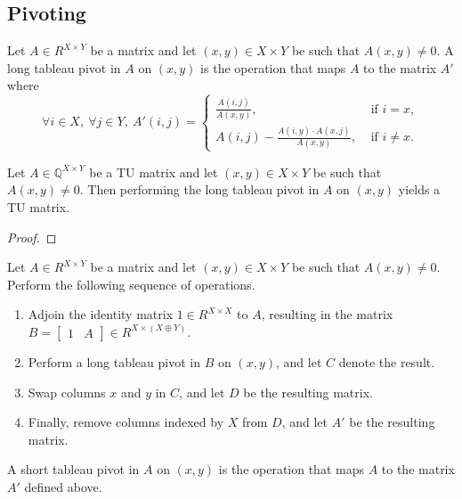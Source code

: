 \subsection{Pivoting}


\begin{definition}
    \label{Matrix.longTableauPivot}
    \leanok
    Let $A \in R^{X \times Y}$ be a matrix and let $(x, y) \in X \times Y$ be such that $A (x, y) \neq 0$. A long tableau pivot in $A$ on $(x, y)$ is the operation that maps $A$ to the matrix $A'$ where
    \[
        \forall i \in X, \ \forall j \in Y, \ A' (i, j) = \begin{cases}
            \frac{A (i, j)}{A (x, y)}, & \text{ if } i = x, \\
            A (i, j) - \frac{A (i, y) \cdot A (x, j)}{A (x, y)}, & \text{ if } i \neq x.
        \end{cases}
    \]
\end{definition}

\begin{lemma}
    \label{Matrix.IsTotallyUnimodular.longTableauPivot}
    \leanok
    Let $A \in \mathbb{Q}^{X \times Y}$ be a TU matrix and let $(x, y) \in X \times Y$ be such that $A (x, y) \neq 0$. Then performing the long tableau pivot in $A$ on $(x, y)$ yields a TU matrix.
\end{lemma}

\begin{proof}
    \leanok
    \SeeLean
\end{proof}



\begin{definition}
    \label{Matrix.shortTableauPivot}
    \leanok
    Let $A \in R^{X \times Y}$ be a matrix and let $(x, y) \in X \times Y$ be such that $A (x, y) \neq 0$. Perform the following sequence of operations.
    \begin{enumerate}
        \item Adjoin the identity matrix $1 \in R^{X \times X}$ to $A$, resulting in the matrix $B = \begin{bmatrix} 1 & A \end{bmatrix} \in R^{X \times (X \oplus Y)}$.
        \item Perform a long tableau pivot in $B$ on $(x, y)$, and let $C$ denote the result.
        \item Swap columns $x$ and $y$ in $C$, and let $D$ be the resulting matrix.
        \item Finally, remove columns indexed by $X$ from $D$, and let $A'$ be the resulting matrix.
    \end{enumerate}
    A short tableau pivot in $A$ on $(x, y)$ is the operation that maps $A$ to the matrix $A'$ defined above.
\end{definition}

